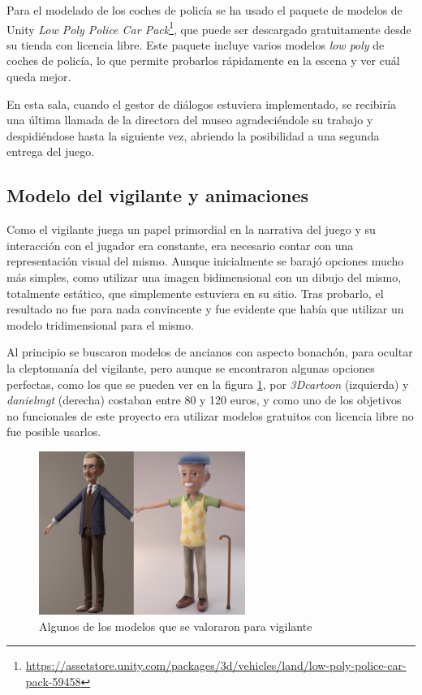 Para el modelado de los coches de policía se ha usado el paquete de modelos de Unity \textit{Low Poly Police Car Pack}\footnote{\url{https://assetstore.unity.com/packages/3d/vehicles/land/low-poly-police-car-pack-59458}}, que puede ser descargado gratuitamente desde su tienda con licencia libre. Este paquete incluye varios modelos \textit{low poly} de coches de policía, lo que permite probarlos rápidamente en la escena y ver cuál queda mejor.

En esta sala, cuando el gestor de diálogos estuviera implementado, se recibiría una última llamada de la directora del museo agradeciéndole su trabajo y despidiéndose hasta la siguiente vez, abriendo la posibilidad a una segunda entrega del juego. 

\subsection{Modelo del vigilante y animaciones}

Como el vigilante juega un papel primordial en la narrativa del juego y su interacción con el jugador era constante, era necesario contar con una representación visual del mismo. Aunque inicialmente se barajó opciones mucho más simples, como utilizar una imagen bidimensional con un dibujo del mismo, totalmente estático, que simplemente estuviera en su sitio. Tras probarlo, el resultado no fue para nada convincente y fue evidente que había que utilizar un modelo tridimensional para el mismo. 

Al principio se buscaron modelos de ancianos con aspecto bonachón, para ocultar la cleptomanía del vigilante, pero aunque se encontraron algunas opciones perfectas, como los que se pueden ver en la figura \ref{fig:modelos-alt}, por \textit{3Dcartoon} (izquierda) y \textit{danielmgt} (derecha) costaban entre 80 y 120 euros, y como uno de los objetivos no funcionales de este proyecto era utilizar modelos gratuitos con licencia libre no fue posible usarlos.

\begin{figure}[!h]
\begin{center}
\includegraphics[width=0.6\textwidth]{imagenes/7/modelos-alt.png}
\caption{Algunos de los modelos que se valoraron para vigilante}
\label{fig:modelos-alt}
\end{center}
\end{figure}

